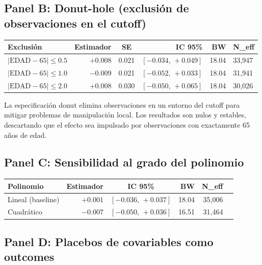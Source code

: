 \documentclass[12pt, a4paper]{article}
\begin{document}
\subsection{Panel B: Donut-hole (exclusión de observaciones en el cutoff)}

\begin{center}
\begin{tabular}{lrcrrl}
\toprule
Exclusión & Estimador & SE & IC 95\% & BW & N\_eff \\
\midrule
$|\text{EDAD} - 65| \leq 0.5$ & $+0.008$ & 0.021 & $[-0.034,\,+0.049]$ & 18.04 & 33{,}947 \\
$|\text{EDAD} - 65| \leq 1.0$ & $-0.009$ & 0.021 & $[-0.052,\,+0.033]$ & 18.04 & 31{,}941 \\
$|\text{EDAD} - 65| \leq 2.0$ & $+0.008$ & 0.030 & $[-0.050,\,+0.065]$ & 18.04 & 30{,}026 \\
\bottomrule
\end{tabular}
\end{center}

\begin{interpcaja}[Interpretación]
La especificación donut elimina observaciones en un entorno del cutoff para
mitigar problemas de manipulación local. Los resultados son nulos y
estables, descartando que el efecto sea impulsado por observaciones con
exactamente 65 años de edad.
\end{interpcaja}

\subsection{Panel C: Sensibilidad al grado del polinomio}

\begin{center}
\begin{tabular}{lrcrrl}
\toprule
Polinomio & Estimador & IC 95\% & BW & N\_eff \\
\midrule
Lineal (baseline) & $+0.001$ & $[-0.036,\,+0.037]$ & 18.04 & 35{,}006 \\
Cuadrático & $-0.007$ & $[-0.050,\,+0.036]$ & 16.51 & 31{,}464 \\
\bottomrule
\end{tabular}
\end{center}

\subsection{Panel D: Placebos de covariables como outcomes}
\end{document}
